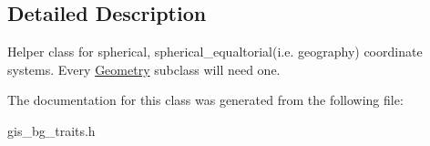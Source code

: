 \subsection{Detailed Description}
Helper class for spherical, spherical\+\_\+equaltorial(i.\+e. geography) coordinate systems. Every \mbox{\hyperlink{classGeometry}{Geometry}} subclass will need one. 

The documentation for this class was generated from the following file\+:\begin{DoxyCompactItemize}
\item 
gis\+\_\+bg\+\_\+traits.\+h\end{DoxyCompactItemize}
